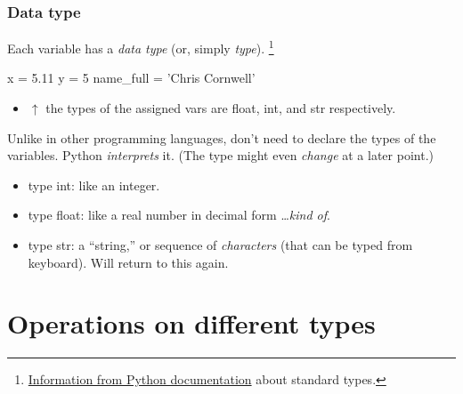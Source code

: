 \documentclass{beamer}
\newenvironment{codeblock}
    {\hfill\begin{beamerboxesrounded}[lower=codecol, width=0.8\textwidth]
    \medskip

    }
    { 
    \end{beamerboxesrounded}\hfill
    }
\theoremstyle{example}
\begin{document}
\begin{frame}[fragile]
\frametitle{Data type}

Each variable has a \emph{data type} (or, simply \emph{type}). \footnote{\href{https://docs.python.org/3/library/stdtypes.html}{Information from Python documentation} about standard types.}

\begin{codeblock}

\begin{python}
x = 5.11
y = 5
name_full = 'Chris Cornwell'
\end{python}

\end{codeblock}

\begin{itemize}
	\item[] $\uparrow$ the types of the assigned vars are {\ttb float}, {\ttb int}, and {\ttb str} respectively.
\end{itemize}

Unlike in other programming languages, don't need to declare the types of the variables. Python \emph{interprets} it. (The type might even \emph{change} at a later point.)

\begin{itemize}
	\item type {\ttb int}: like an integer.
	\item type {\ttb float}: like a real number in decimal form \ldots \emph{kind of}.
	\item type {\ttb str}: a ``string,'' or sequence of \emph{characters} (that can be typed from keyboard). Will return to this again.
\end{itemize}
\end{frame}

\section{Operations on different types}
\end{document}
